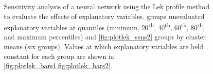 \documentclass[article,shortnames]{jss}
\begin{document}
\begin{figure}[!ht]
\centering
{}

\caption{Sensitivity analysis of a neural network using the Lek profile method to evaluate the effects of explanatory variables.   groups unevaluated explanatory variables at quantiles (minimum, 20\textsuperscript{th}, 40\textsuperscript{th}, 60\textsuperscript{th}, 80\textsuperscript{th}, and maximum percentiles) and \cref{fig:plotlek_sens2} groups by cluster means (six groups).  Values at which explanatory variables are held constant for each group are shown in \cref{fig:plotlek_bars1,fig:plotlek_bars2}.}
\label{fig:plotlek_sens}
\end{figure}
\end{document}
